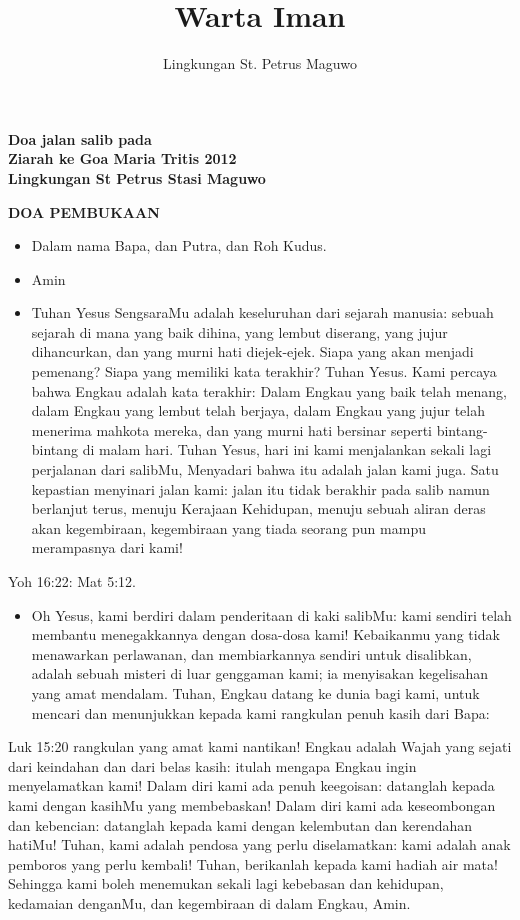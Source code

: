 \documentclass[a5paper,titlepage,11pt,openany]{scrbook}
\author{Lingkungan St. Petrus Maguwo}
\title{Warta Iman}
\newcommand{\BU}[1]{\begin{itemize} \item[U:] #1 \end{itemize}}
\newcommand{\BP}[1]{\begin{itemize} \item[P:] #1 \end{itemize}}
\begin{document}
\begin{center}
\textbf{Doa jalan salib pada\\
Ziarah ke Goa Maria Tritis 2012\\
Lingkungan St Petrus Stasi Maguwo}
\end{center}



\textbf{DOA PEMBUKAAN}

\BP{Dalam nama Bapa, dan Putra, dan Roh Kudus. }
\BU{Amin }



\BP{Tuhan Yesus SengsaraMu adalah keseluruhan dari sejarah manusia: sebuah sejarah di mana yang baik dihina, yang lembut diserang, yang jujur dihancurkan, dan yang murni hati diejek-ejek. Siapa yang akan menjadi pemenang? Siapa yang memiliki kata terakhir? Tuhan Yesus. Kami percaya bahwa Engkau adalah kata terakhir: Dalam Engkau yang baik telah menang, dalam Engkau yang lembut telah berjaya, dalam Engkau yang jujur telah menerima mahkota mereka, dan yang murni hati bersinar seperti bintang-bintang di malam hari. Tuhan Yesus, hari ini kami menjalankan sekali lagi perjalanan dari salibMu, Menyadari bahwa itu adalah jalan kami juga. Satu kepastian menyinari jalan kami: jalan itu tidak berakhir pada salib namun berlanjut terus, menuju Kerajaan Kehidupan, menuju sebuah aliran deras akan kegembiraan, kegembiraan yang tiada seorang pun mampu merampasnya dari kami!}

Yoh 16:22: Mat 5:12.

\BU{Oh Yesus, kami berdiri dalam penderitaan di kaki salibMu: kami sendiri telah membantu menegakkannya dengan dosa-dosa kami! Kebaikanmu yang tidak menawarkan perlawanan, dan membiarkannya sendiri untuk disalibkan, adalah sebuah misteri di luar genggaman kami; ia menyisakan kegelisahan yang amat mendalam. Tuhan, Engkau datang ke dunia bagi kami, untuk mencari dan menunjukkan kepada kami rangkulan penuh kasih dari Bapa:}

Luk 15:20  rangkulan yang amat kami nantikan! Engkau adalah Wajah yang sejati dari keindahan dan dari belas kasih: itulah mengapa Engkau ingin menyelamatkan kami! Dalam diri kami ada penuh keegoisan: datanglah kepada kami dengan kasihMu yang membebaskan! Dalam diri kami ada keseombongan dan kebencian: datanglah kepada kami dengan kelembutan dan kerendahan hatiMu! Tuhan, kami adalah pendosa yang perlu diselamatkan: kami adalah anak pemboros yang perlu kembali! Tuhan, berikanlah kepada kami hadiah air mata! Sehingga kami boleh menemukan sekali lagi kebebasan dan kehidupan, kedamaian denganMu, dan kegembiraan di dalam Engkau, Amin. 
\end{document}
